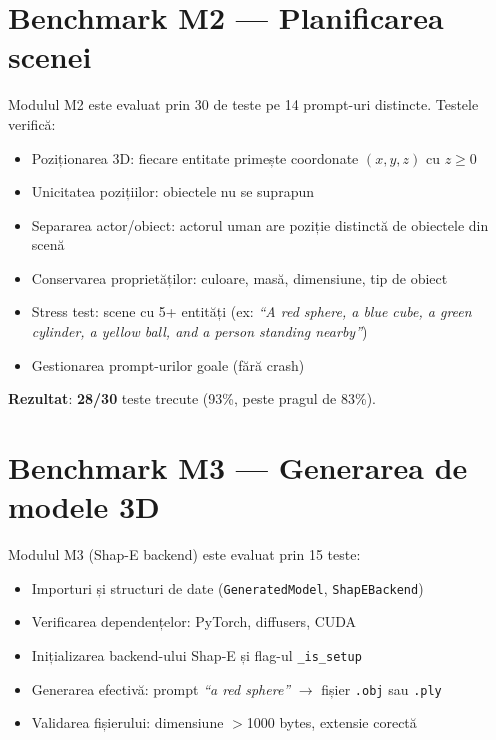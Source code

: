 \section{Benchmark M2 --- Planificarea scenei}

Modulul M2 este evaluat prin 30 de teste pe 14 prompt-uri distincte.  Testele verifică:

\begin{itemize}
    \item Poziționarea 3D: fiecare entitate primește coordonate $(x, y, z)$ cu $z \geq 0$
    \item Unicitatea pozițiilor: obiectele nu se suprapun
    \item Separarea actor/obiect: actorul uman are poziție distinctă de obiectele din scenă
    \item Conservarea proprietăților: culoare, masă, dimensiune, tip de obiect
    \item Stress test: scene cu 5+ entități (ex: \textit{``A red sphere, a blue cube, a green cylinder, a yellow ball, and a person standing nearby''})
    \item Gestionarea prompt-urilor goale (fără crash)
\end{itemize}

\textbf{Rezultat}: \textbf{28/30} teste trecute (93\%, peste pragul de 83\%).

\section{Benchmark M3 --- Generarea de modele 3D}

Modulul M3 (Shap-E backend) este evaluat prin 15 teste:

\begin{itemize}
    \item Importuri și structuri de date (\texttt{GeneratedModel}, \texttt{ShapEBackend})
    \item Verificarea dependențelor: PyTorch, diffusers, CUDA
    \item Inițializarea backend-ului Shap-E și flag-ul \texttt{\_is\_setup}
    \item Generarea efectivă: prompt \textit{``a red sphere''} $\rightarrow$ fișier \texttt{.obj} sau \texttt{.ply}
    \item Validarea fișierului: dimensiune $>$1000 bytes, extensie corectă
\end{itemize}

